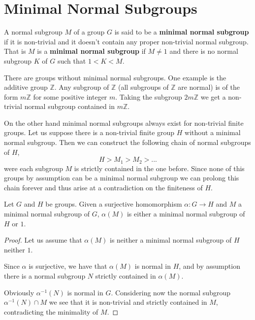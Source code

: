 \pagebreak

\section{Minimal Normal Subgroups}

\begin{definition}
A normal subgroup $M$ of a group $G$ is said to be a \textbf{minimal normal subgroup} if it is non-trivial and it doesn't contain any proper non-trivial normal subgroup. That is $M$ is a \textbf{minimal normal subgroup} if $M \ne 1$ and there is no normal subgroup $K$ of $G$ such that $1 < K < M$. 
\end{definition}

There are groups without minimal normal subgroups. One example is the additive group $\mathbb{Z}$. Any subgroup of $\mathbb{Z}$ (all subgroups of $\mathbb{Z}$ are normal) is of the form $m\mathbb{Z}$ for some positive integer $m$. Taking the subgroup $2m\mathbb{Z}$ we get a non-trivial normal subgroup contained in $m\mathbb{Z}$.

On the other hand minimal normal subgroups always exist for non-trivial finite groups. 
Let us suppose there is a non-trivial finite group $H$ without a minimal normal subgroup. Then we can construct the following chain of normal subgroups of $H$,
$$
H > M_1 > M_2 > ...
$$
were each subgroup $M$ is strictly contained in the one before. Since none of this groups by assumption can be a minimal normal subgroup we can prolong this chain forever and thus arise at a contradiction on the finiteness of $H$.

\begin{theorem}
    \label{hommnsub}
    Let $G$ and $H$ be groups.
    Given a surjective homomorphism $\alpha\colon G \rightarrow H$ and $M$ a minimal normal subgroup of $G$, $\alpha(M)$ is either a minimal normal subgroup of $H$ or $1$.
\end{theorem}
\begin{proof}
    Let us assume that $\alpha(M)$ is neither a minimal normal subgroup of $H$ neither $1$.

    Since $\alpha$ is surjective, we have that $\alpha(M)$ is normal in $H$, and by assumption there is a normal subgroup $N$ strictly contained in $\alpha(M)$.
    
    Obviously $\alpha^{-1}(N)$ is normal in $G$. Considering now the normal subgroup $\alpha^{-1}(N) \cap M$ we see that it is non-trivial and strictly contained in $M$, contradicting the minimality of $M$.
\end{proof}

